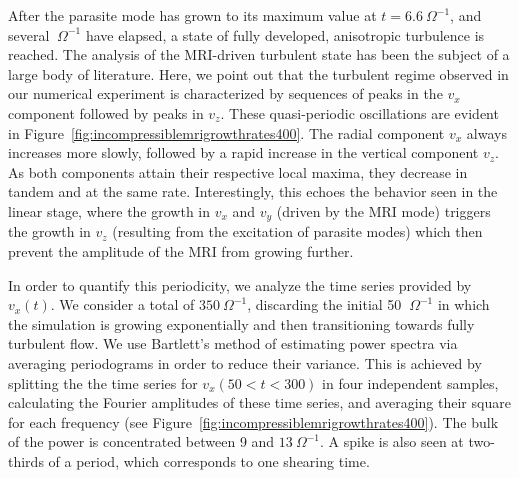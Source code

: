 \documentclass[]{emulateapj}
\begin{document}
After the parasite mode has grown to its maximum value at $t= 6.6~\Omega^{-1}$,
and several $~\Omega^{-1}$ have elapsed, a state of fully developed,
anisotropic turbulence is reached. The analysis of the MRI-driven 
turbulent state has been the subject of a large body of literature.
Here, we point out that the turbulent regime observed in our numerical
experiment is characterized by sequences of peaks in the $v_x$ component
followed  by peaks in $v_z$.  These quasi-periodic oscillations are evident in 
Figure~\ref{fig:incompressiblemrigrowthrates400}.  The radial component $v_x$
always increases more slowly, followed by a rapid increase in the vertical component
$v_z$. As both components attain their respective local maxima, they
decrease in tandem and at the same rate.  Interestingly, this echoes the behavior 
seen in the linear stage, where the growth in $v_x$ and $v_{y}$ (driven by the MRI 
mode) triggers the growth in $v_z$ (resulting from the excitation of parasite modes) 
which then prevent the amplitude of the MRI from growing further.

In order to quantify this periodicity, we analyze the time series
provided by $v_x(t)$.  We consider a total of $350 ~\Omega^{-1}$, 
discarding the initial 50 $~\Omega^{-1}$ in which the simulation 
is growing exponentially and then transitioning towards fully turbulent flow.
We use Bartlett's method of estimating power
spectra via averaging periodograms \citep{1948Natur.161..686B} in
order to reduce their variance. This is achieved by splitting the
the time series for $v_x(50<t<300)$ in four independent samples,
calculating the Fourier amplitudes of these time series, and averaging
their square for each frequency (see
Figure~\ref{fig:incompressiblemrigrowthrates400}).  The bulk of the
power is concentrated between 9 and $13~\Omega^{-1}$.  A spike is also seen
at two-thirds of a period, which corresponds to one shearing time.
\end{document}

